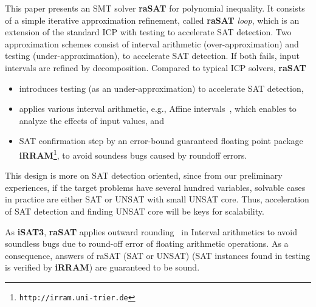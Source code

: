 \documentclass[runningheads,a4paper,oribibl]{llncs}
\begin{document}
This paper presents an SMT solver {\bf raSAT} for polynomial inequality. 
It consists of a simple iterative approximation refinement, called {\bf raSAT} {\em loop}, 
which is an extension of the standard ICP with testing to accelerate SAT detection. 
Two approximation schemes consist of interval arithmetic (over-approximation) and 
testing (under-approximation), to accelerate SAT detection. 
If both fails, input intervals are refined by decomposition. 
%
Compared to typical ICP solvers, {\bf raSAT} 
\begin{itemize}
\item introduces testing (as an under-approximation) to accelerate SAT detection, 
\item applies various interval arithmetic, e.g., Affine intervals~\cite{Messine_extensionsof,Ngoc:2009:ORE:1685167.1685421,VanKhanh201227}, 
which enables to analyze the effects of input values, and 
\item SAT confirmation step by an error-bound guaranteed floating point package {\bf iRRAM}\footnote{%
\tt http://irram.uni-trier.de}, to avoid soundess bugs caused by roundoff errors. 
\end{itemize}
This design is more on SAT detection oriented, since from our preliminary experiences, 
if the target problems have several hundred variables, solvable cases in practice are 
either SAT or UNSAT with small UNSAT core. 
Thus, acceleration of SAT detection and finding UNSAT core will be keys for scalability. 

As \textbf{iSAT3}, \textbf{raSAT} applies outward rounding~\cite{Hickey:2001:IAP:502102.502106} in Interval arithmetics to avoid soundless bugs due to round-off error of floating arithmetic operations. As a consequence, answers of raSAT (SAT or UNSAT) (SAT instances found in testing is verified by \textbf{iRRAM}) are guaranteed to be sound.
\end{document}
